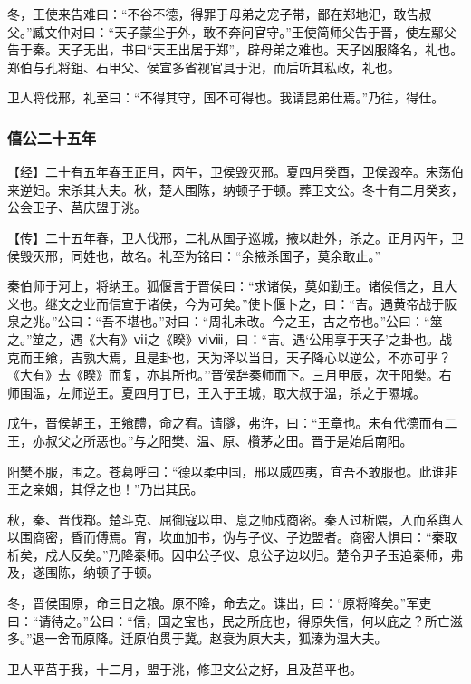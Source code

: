 \documentclass[]{article}
\begin{document}
冬，王使来告难曰：``不谷不德，得罪于母弟之宠子带，鄙在郑地汜，敢告叔父。''臧文仲对曰：``天子蒙尘于外，敢不奔问官守。''王使简师父告于晋，使左鄢父告于秦。天子无出，书曰``天王出居于郑''，辟母弟之难也。天子凶服降名，礼也。郑伯与孔将鉏、石甲父、侯宣多省视官具于汜，而后听其私政，礼也。

卫人将伐邢，礼至曰：``不得其守，国不可得也。我请昆弟仕焉。''乃往，得仕。

\hypertarget{header-n929}{%
\subsubsection{僖公二十五年}\label{header-n929}}

【经】二十有五年春王正月，丙午，卫侯毁灭邢。夏四月癸酉，卫侯毁卒。宋荡伯来逆妇。宋杀其大夫。秋，楚人围陈，纳顿子于顿。葬卫文公。冬十有二月癸亥，公会卫子、莒庆盟于洮。

【传】二十五年春，卫人伐邢，二礼从国子巡城，掖以赴外，杀之。正月丙午，卫侯毁灭邢，同姓也，故名。礼至为铭曰：``余掖杀国子，莫余敢止。''

秦伯师于河上，将纳王。狐偃言于晋侯曰：``求诸侯，莫如勤王。诸侯信之，且大义也。继文之业而信宣于诸侯，今为可矣。''使卜偃卜之，曰：``吉。遇黄帝战于阪泉之兆。''公曰：``吾不堪也。''对曰：``周礼未改。今之王，古之帝也。''公曰：``筮之。''筮之，遇《大有》ⅵⅰ之《睽》ⅵⅷ，曰：``吉。遇`公用享于天子'之卦也。战克而王飨，吉孰大焉，且是卦也，天为泽以当日，天子降心以逆公，不亦可乎？《大有》去《睽》而复，亦其所也。''晋侯辞秦师而下。三月甲辰，次于阳樊。右师围温，左师逆王。夏四月丁巳，王入于王城，取大叔于温，杀之于隰城。

戊午，晋侯朝王，王飨醴，命之宥。请隧，弗许，曰：``王章也。未有代德而有二王，亦叔父之所恶也。''与之阳樊、温、原、欑茅之田。晋于是始启南阳。

阳樊不服，围之。苍葛呼曰：``德以柔中国，邢以威四夷，宜吾不敢服也。此谁非王之亲姻，其俘之也！''乃出其民。

秋，秦、晋伐鄀。楚斗克、屈御寇以申、息之师戍商密。秦人过析隈，入而系舆人以围商密，昏而傅焉。宵，坎血加书，伪与子仪、子边盟者。商密人惧曰：``秦取析矣，戍人反矣。''乃降秦师。囚申公子仪、息公子边以归。楚令尹子玉追秦师，弗及，遂围陈，纳顿子于顿。

冬，晋侯围原，命三日之粮。原不降，命去之。谍出，曰：``原将降矣。''军吏曰：``请待之。''公曰：``信，国之宝也，民之所庇也，得原失信，何以庇之？所亡滋多。''退一舍而原降。迁原伯贯于冀。赵衰为原大夫，狐溱为温大夫。

卫人平莒于我，十二月，盟于洮，修卫文公之好，且及莒平也。
\end{document}
